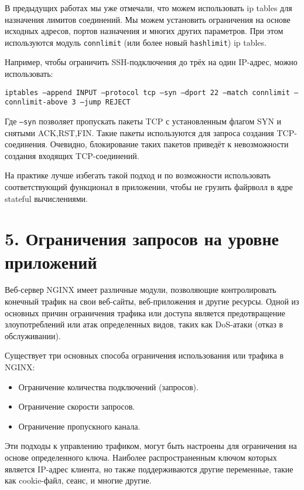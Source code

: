 В предыдущих работах мы уже отмечали, что можем использовать ip tables для назначения лимитов соединений. Мы можем установить ограничения на основе исходных адресов, портов назначения и многих других параметров. При этом используются модуль \texttt{connlimit} (или более новый \texttt{hashlimit}) ip tables.

Например, чтобы ограничить SSH-подключения до трёх на один IP-адрес, можно использовать:

\texttt{iptables --append INPUT --protocol tcp --syn --dport 22 --match connlimit --connlimit-above 3 --jump REJECT}

Где \texttt{--syn} позволяет пропускать пакеты TCP с установленным флагом SYN и снятыми ACK,RST,FIN. Такие пакеты используются для запроса создания TCP-соединения. Очевидно, блокирование таких пакетов приведёт к невозможности создания входящих TCP-соединений.

На практике лучше избегать такой подход и по возможности использовать соответствующий функционал в приложении, чтобы не грузить файрволл в ядре stateful вычислениями.

\section*{5. Ограничения запросов на уровне приложений}

Веб-сервер NGINX имеет различные модули, позволяющие контролировать конечный трафик на свои веб-сайты, веб-приложения и другие ресурсы. Одной из основных причин ограничения трафика или доступа является предотвращение злоупотреблений или атак определенных видов, таких как DoS-атаки (отказ в обслуживании).

Существует три основных способа ограничения использования или трафика в NGINX:
\begin{itemize}
    \item Ограничение количества подключений (запросов).
    \item Ограничение скорости запросов.
    \item Ограничение пропускного канала.
\end{itemize}

Эти подходы к управлению трафиком, могут быть настроены для ограничения на основе определенного ключа. Наиболее распространенным ключом которых является IP-адрес клиента, но также поддерживаются другие переменные, такие как cookie-файл, сеанс, и многие другие.

